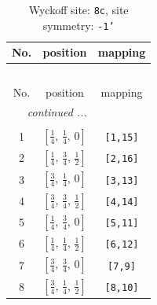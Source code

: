 \documentclass[fleqn,8pt]{jsarticle}
\begin{document}
\renewcommand{\arraystretch}{1.2}
\begin{longtable}{ccc}
\caption{Wyckoff site: {\tt 8c}, site symmetry: {\tt -1'}}
 \\
 \hline \hline
No. & position & mapping \\ \hline \endfirsthead

\multicolumn{2}{l}{\tablename\ \thetable{}} \\
 \hline \hline
No. & position & mapping \\ \hline \endhead

 \hline \hline
\multicolumn{2}{r}{\footnotesize\it continued ...} \\ \endfoot

 \hline \hline
\multicolumn{2}{r}{} \\ \endlastfoot

1 & $\left[ \frac{1}{4},\, \frac{1}{4},\, 0 \right]$ & {\tt [1,15]} \\ \hline
2 & $\left[ \frac{1}{4},\, \frac{3}{4},\, \frac{1}{2} \right]$ & {\tt [2,16]} \\ \hline
3 & $\left[ \frac{3}{4},\, \frac{1}{4},\, 0 \right]$ & {\tt [3,13]} \\ \hline
4 & $\left[ \frac{3}{4},\, \frac{3}{4},\, \frac{1}{2} \right]$ & {\tt [4,14]} \\ \hline
5 & $\left[ \frac{1}{4},\, \frac{3}{4},\, 0 \right]$ & {\tt [5,11]} \\ \hline
6 & $\left[ \frac{1}{4},\, \frac{1}{4},\, \frac{1}{2} \right]$ & {\tt [6,12]} \\ \hline
7 & $\left[ \frac{3}{4},\, \frac{3}{4},\, 0 \right]$ & {\tt [7,9]} \\ \hline
8 & $\left[ \frac{3}{4},\, \frac{1}{4},\, \frac{1}{2} \right]$ & {\tt [8,10]} \\
\end{longtable}
\renewcommand{\arraystretch}{1.2}
\end{document}
